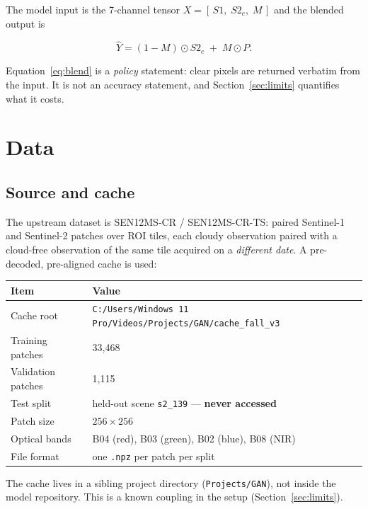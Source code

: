 \documentclass[10pt,a4paper]{article}
\newcommand{\code}[1]{\texttt{#1}}
\begin{document}
The model input is the 7-channel tensor $X = [\,S1,\; S2_c,\; M\,]$ and the blended output is

\begin{equation}
\hat Y = (1-M)\odot S2_c \;+\; M \odot P .
\label{eq:blend}
\end{equation}

Equation~\eqref{eq:blend} is a \emph{policy} statement: clear pixels are returned verbatim from the
input. It is not an accuracy statement, and Section~\ref{sec:limits} quantifies what it costs.

\section{Data}

\subsection{Source and cache}

The upstream dataset is SEN12MS-CR / SEN12MS-CR-TS: paired Sentinel-1 and Sentinel-2 patches over
ROI tiles, each cloudy observation paired with a cloud-free observation of the same tile acquired
on a \emph{different date}. A pre-decoded, pre-aligned cache is used:

\begin{center}
\begin{tabular}{@{}ll@{}}
\hline
Item & Value \\
\hline
Cache root & \code{C:/Users/Windows 11 Pro/Videos/Projects/GAN/cache\_fall\_v3} \\
Training patches & 33{,}468 \\
Validation patches & 1{,}115 \\
Test split & held-out scene \code{s2\_139} --- \textbf{never accessed} \\
Patch size & $256\times256$ \\
Optical bands & B04 (red), B03 (green), B02 (blue), B08 (NIR) \\
File format & one \code{.npz} per patch per split \\
\hline
\end{tabular}
\end{center}

The cache lives in a sibling project directory (\code{Projects/GAN}), not inside the model
repository. This is a known coupling in the setup (Section~\ref{sec:limits}).
\end{document}
